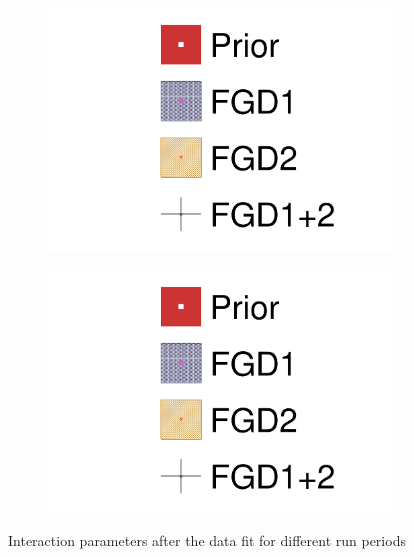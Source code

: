 \begin{figure}[h]
	\begin{subfigure}[t]{0.49\textwidth}
		\includegraphics[width=\textwidth, trim={0mm 0mm 0mm 0mm}, clip,page=20]{figures/mach3/data/alt/2017b_FGD1_Data_merge_2017b_FGD2_Data_merge_2017b_NewData_NewDet_UpdXsecStep_2Xsec_4Det_5Flux_0}
	\end{subfigure}
	\begin{subfigure}[t]{0.49\textwidth}
		\includegraphics[width=\textwidth, trim={0mm 0mm 0mm 0mm}, clip,page=21]{figures/mach3/data/alt/2017b_FGD1_Data_merge_2017b_FGD2_Data_merge_2017b_NewData_NewDet_UpdXsecStep_2Xsec_4Det_5Flux_0}
	\end{subfigure}
	\caption{Interaction parameters after the data fit for different run periods}
	\label{fig:xsec_data_fdg1vsfgd2}
\end{figure}

